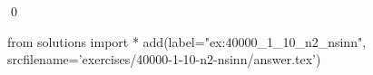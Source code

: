 \begin{ex}
  \label{ex:40000_1_10_n2_nsinn}
  
  \mbox{}\\ \\
  \qed
\end{ex}
\begin{python0}
from solutions import *
add(label="ex:40000_1_10_n2_nsinn",
    srcfilename='exercises/40000-1-10-n2-nsinn/answer.tex') 
\end{python0}                              
